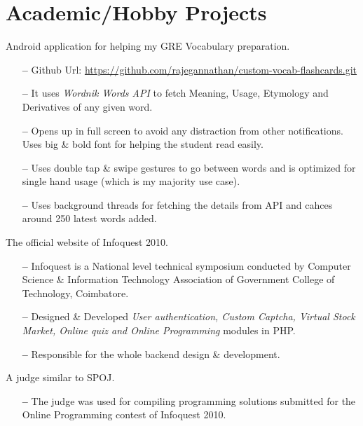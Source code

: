\documentclass{cv}
\begin{document}
\section{Academic/Hobby Projects}
\begin{description}[leftmargin=50pt,labelwidth=50pt]
  \item[Gre Wordcards] Android application for helping my GRE Vocabulary preparation.
    \begin{itemize}[label={},leftmargin=10pt,topsep=0pt]
      \item[\textbf{--}] Github Url: \url{https://github.com/rajegannathan/custom-vocab-flashcards.git}
      \item[\textbf{--}] It uses \textit{Wordnik Words API} to fetch Meaning, Usage, Etymology and Derivatives of any given word.
      \item[\textbf{--}] Opens up in full screen to avoid any distraction from other notifications.  Uses big \& bold font for helping the student read easily.
      \item[\textbf{--}] Uses double tap \& swipe gestures to go between words and is optimized for single hand usage (which is my majority use case).
      \item[\textbf{--}] Uses background threads for fetching the details from API and cahces around 250 latest words added.
    \end{itemize}
  \item[infoquestgct.com] The official website of Infoquest 2010.  
    \begin{itemize}[label={},leftmargin=10pt,topsep=0pt]
      \item[\textbf{--}] Infoquest is a National level technical symposium conducted by Computer Science \& Information Technology Association of Government College of Technology, Coimbatore.
      \item[\textbf{--}] Designed \& Developed \textit{User authentication, Custom Captcha, Virtual Stock Market, Online quiz and Online Programming} modules in PHP\@.
      \item[\textbf{--}] Responsible for the whole backend design \& development.
    \end{itemize}
  \item[Online Judge] A judge similar to SPOJ\@.
    \begin{itemize}[label={},leftmargin=10pt,topsep=0pt]
      \item[\textbf{--}] The judge was used for compiling programming solutions submitted for the Online Programming contest of Infoquest 2010.

\end{itemize}
\end{description}
\end{document}
